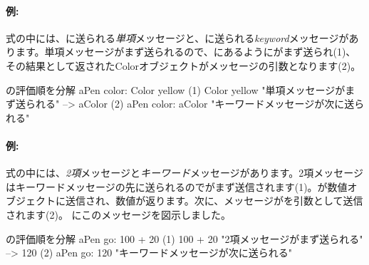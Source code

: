\documentclass[a4paper,10pt,twoside]{book}
\begin{document}


\paragraph{例:} 式の中には、に送られる\emph{単項}メッセージと、に送られる\emph{keyword}メッセージがあります。単項メッセージがまず送られるので、にあるようにがまず送られ(1)、その結果として返されたColorオブジェクトがメッセージの引数となります(2)。

\begin{example}[decColor]{の評価順を分解}{}
        aPen color: Color yellow
(1)                       Color yellow        "単項メッセージがまず送られる"
                        --> aColor
(2)   aPen color: aColor                 "キーワードメッセージが次に送られる"
\end{example}

\paragraph{例:} 式の中には、\emph{2項}メッセージと\emph{キーワード}メッセージがあります。2項メッセージはキーワードメッセージの先に送られるのでがまず送信されます(1)。が数値オブジェクトに送信され、数値が返ります。次に、メッセージがを引数として送信されます(2)。
にこのメッセージを図示しました。

\begin{example}[decGo]{の評価順を分解}{}
      aPen go: 100 + 20   
(1)                 100 + 20           "2項メッセージがまず送られる"
                   -->   120
(2)  aPen go: 120                   "キーワードメッセージが次に送られる"
\end{example}
\end{document}

